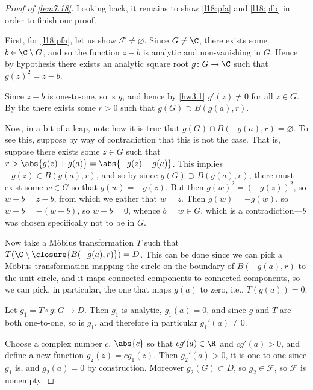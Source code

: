 \begin{proof}[Proof of \autoref{lem7.18}]
	Looking back, it remains to show \ref{l18:pfa} and \ref{l18:pfb} in order to finish our proof.

	First, for \ref{l18:pfa}, let us show $\mathcal{F} \neq \varnothing$.
	Since $G \neq \C$, there exists some $b \in \C \setminus G$, and so the function $z - b$ is analytic and non-vanishing in $G$.
	Hence by hypothesis there exists an analytic square root $g \colon G \to \C$ such that $g(z)^2 = z - b$.

	Since $z - b$ is one-to-one, so is $g$, and hence by \autoref{hw3.1} $g'(z) \neq 0$ for all $z \in G$.
	By the  there exists some $r > 0$ such that $g(G) \supset B(g(a), r)$.

	\begin{marginfigure}

		\caption{\label{lem718:fig} The image of $g$ contains a ball by the . The reflected ball does not meet the image.}
	\end{marginfigure}

	Now, in a bit of a leap, note how it is true that $g(G) \cap B(-g(a), r) = \varnothing$.
	To see this, suppose by way of contradiction that this is not the case.
	That is, suppose there exists some $z \in G$ such that $r > \abs{g(z) + g(a)} = \abs{-g(z) - g(a)}$.
	This implies $-g(z) \in B(g(a), r)$, and so by since $g(G) \supset B(g(a), r)$, there must exist some $w \in G$ so that $g(w) = - g(z)$.
	But then $g(w)^2 = (-g(z))^2$, so $w - b = z - b$, from which we gather that $w = z$.
	Then $g(w) = - g(w)$, so $w - b = -(w - b)$, so $w - b = 0$, whence $b = w \in G$, which is a contradiction---$b$ was chosen specifically not to be in $G$.

	Now take a Möbius transformation $T$ such that $T(\C \setminus \closure{B(-g(a), r)}) = D$.
	This can be done since we can pick a Möbius transformation mapping the circle on the boundary of $B(-g(a), r)$ to the unit circle, and it maps connected components to connected components, so we can pick, in particular, the one that maps $g(a)$ to zero, i.e., $T(g(a)) = 0$.

	Let $g_1 = T \circ g \colon G \to D$.
	Then $g_1$ is analytic, $g_1(a) = 0$, and since $g$ and $T$ are both one-to-one, so is $g_1$, and therefore in particular $g_1'(a) \neq 0$.

	Choose a complex number $c$, $\abs{c}$ so that $c g'(a) \in \R$ and $c g'(a) > 0$, and define a new function $g_2(z) = c g_1(z)$.
	Then $g_2'(a) > 0$, it is one-to-one since $g_1$ is, and $g_2(a) = 0$ by construction.
	Moreover $g_2(G) \subset D$, so $g_2 \in \mathcal{F}$, so $\mathcal{F}$ is nonempty.


\end{proof}
